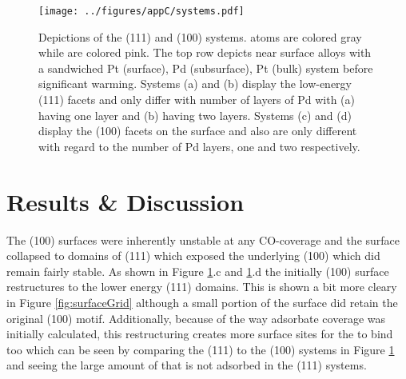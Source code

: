 \begin{landscape}
\begin{figure}[p!]
\centering
  \texttt{[image: ../figures/appC/systems.pdf]}
  \caption{Depictions of the (111) and (100) systems.  atoms are colored
gray while  are colored pink. The top row depicts near surface alloys
with a sandwiched Pt (surface), Pd (subsurface), Pt (bulk) system before
significant warming. Systems (a) and (b) display the low-energy (111) facets
and only differ with number of layers of Pd with (a) having one layer and (b)
having two layers. Systems (c) and (d) display the (100) facets on the surface
and also are only different with regard to the number of Pd layers, one and two
respectively.}
\label{fig:biSystems}
\end{figure}
\end{landscape}

\section{Results \& Discussion}
The (100) surfaces were inherently unstable at any CO-coverage and the surface
 collapsed to domains of (111) which exposed the underlying (100)
 which did remain fairly stable. As shown in Figure
\ref{fig:biSystems}.c and \ref{fig:biSystems}.d the initially (100) surface
restructures to the lower energy (111) domains. This is shown a bit more cleary
in Figure \ref{fig:surfaceGrid} although a small portion of the surface did
retain the original (100) motif. Additionally, because of the way adsorbate
coverage was initially calculated, this restructuring creates more surface
sites for the  to bind too which can be seen by comparing the (111) to
the (100) systems in Figure \ref{fig:biSystems} and seeing the large amount of
 that is not adsorbed in the (111) systems.

